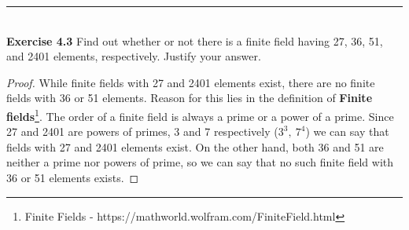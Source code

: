 \documentclass[a4paper]{article}
\begin{document}
\noindent\rule{12cm}{0.4pt}\\
\noindent \textbf{Exercise 4.3} Find out whether or not there is a finite field having 27, 36, 51, and 2401 elements, respectively. Justify your answer.
\begin{proof}
While finite fields with 27 and 2401 elements exist, there are no finite fields with 36 or 51 elements. Reason for this lies in the definition of \textbf{Finite fields}\footnote{Finite Fields - https://mathworld.wolfram.com/FiniteField.html}. The order of a finite field is always a prime or a power of a prime. Since 27 and 2401 are powers of primes, 3 and 7 respectively ($3^3,\ 7^4$) we can say that fields with 27 and 2401 elements exist. On the other hand, both 36 and 51 are neither a prime nor powers of prime, so we can say that no such finite field with 36 or 51 elements exists.
\end{proof}
\end{document}
